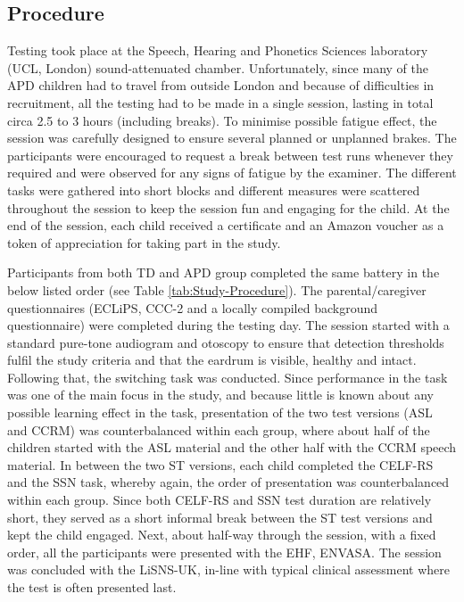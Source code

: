 \documentclass[a4paper, twoside]{templates/ociamthesis}
\begin{document}
\hypertarget{procedure}{%
\subsection{Procedure}\label{procedure}}

Testing took place at the Speech, Hearing and Phonetics Sciences laboratory (UCL, London) sound-attenuated chamber. Unfortunately, since many of the APD children had to travel from outside London and because of difficulties in recruitment, all the testing had to be made in a single session, lasting in total circa 2.5 to 3 hours (including breaks). To minimise possible fatigue effect, the session was carefully designed to ensure several planned or unplanned brakes. The participants were encouraged to request a break between test runs whenever they required and were observed for any signs of fatigue by the examiner. The different tasks were gathered into short blocks and different measures were scattered throughout the session to keep the session fun and engaging for the child. At the end of the session, each child received a certificate and an Amazon voucher as a token of appreciation for taking part in the study.

Participants from both TD and APD group completed the same battery in the below listed order (see Table \ref{tab:Study-Procedure}). The parental/caregiver questionnaires (ECLiPS, CCC-2 and a locally compiled background questionnaire) were completed during the testing day. The session started with a standard pure-tone audiogram and otoscopy to ensure that detection thresholds fulfil the study criteria and that the eardrum is visible, healthy and intact. Following that, the switching task was conducted. Since performance in the task was one of the main focus in the study, and because little is known about any possible learning effect in the task, presentation of the two test versions (ASL and CCRM) was counterbalanced within each group, where about half of the children started with the ASL material and the other half with the CCRM speech material. In between the two ST versions, each child completed the CELF-RS and the SSN task, whereby again, the order of presentation was counterbalanced within each group. Since both CELF-RS and SSN test duration are relatively short, they served as a short informal break between the ST test versions and kept the child engaged. Next, about half-way through the session, with a fixed order, all the participants were presented with the EHF, ENVASA. The session was concluded with the LiSNS-UK, in-line with typical clinical assessment where the test is often presented last.
\end{document}
